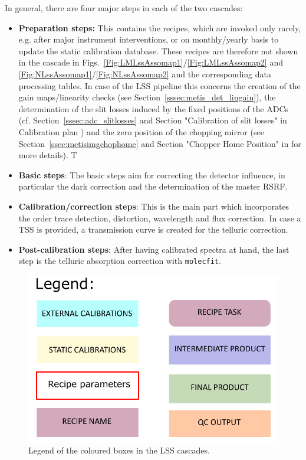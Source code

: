 In general, there are four major steps in each of the two cascades:
\begin{itemize}
    \item \textbf{Preparation steps:} This contains the recipes, which are invoked only rarely, e.g. after major instrument interventions, or on monthly/yearly basis to update the static calibration database. These recipes are therefore not shown in the cascade in Figs.~\ref{Fig:LMLssAssomap1}/\ref{Fig:LMLssAssomap2} and \ref{Fig:NLssAssomap1}/\ref{Fig:NLssAssomap2} and the corresponding data processing tables. In case of the \ac{LSS} pipeline this concerns the creation of the gain maps/linearity checks (see Section~\ref{sssec:metis_det_lingain}), the determination of the slit losses induced by the fixed positions of the ADCs (cf. Section~\ref{sssec:adc_slitlosses} and Section "Calibration of slit losses" in Calibration plan \cite{METIS-calibration_plan}) and the zero position of the chopping mirror (see Section~\ref{ssec:metisimgchophome} and Section "Chopper Home Position" in \cite{METIS-calibration_plan} for more details). T
    \item \textbf{Basic steps}: The basic steps aim for correcting the detector influence, in particular the dark correction and the determination of the master \ac{RSRF}.
    \item \textbf{Calibration/correction steps}: This is the main part which incorporates the order trace detection, distortion, wavelength and flux correction. In case a \ac{TSS} is provided, a transmission curve is created for the telluric correction.
    \item \textbf{Post-calibration steps}: After having calibrated spectra at hand, the last step is the telluric absorption correction with \texttt{molecfit}.
\end{itemize}

\begin{figure}[ht]
  \centering
  \includegraphics[width=0.4\textheight]{figures/legend.pdf}
  \caption[Legend]{Legend of the coloured boxes in the \ac{LSS} cascades.}
  \label{Fig:LSScascadelegend}
\end{figure}
\clearpage

